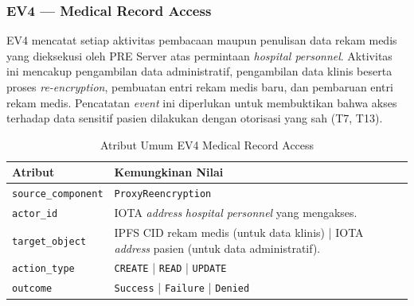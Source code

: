 \subsubsection{EV4 --- Medical Record Access}
\label{subsec:ev4-medical-record-access}

EV4 mencatat setiap aktivitas pembacaan maupun penulisan data rekam medis
yang dieksekusi oleh PRE Server atas permintaan \textit{hospital personnel}.
Aktivitas ini mencakup pengambilan data administratif, pengambilan data klinis
beserta proses \textit{re-encryption}, pembuatan entri rekam medis baru, dan
pembaruan entri rekam medis. Pencatatan \textit{event} ini diperlukan untuk
membuktikan bahwa akses terhadap data sensitif pasien dilakukan dengan otorisasi
yang sah (T7, T13).

\begin{table}[htbp]
\centering
\caption{Atribut Umum EV4 Medical Record Access}
\label{tab:ev4-umum}
\renewcommand{\arraystretch}{1.3}
\begin{tabular}{|p{3.5cm}|p{8.5cm}|}
\hline
\textbf{Atribut} & \textbf{Kemungkinan Nilai} \\
\hline
\texttt{source\_component} &
\texttt{ProxyReencryption} \\
\hline
\texttt{actor\_id} &
IOTA \textit{address} \textit{hospital personnel} yang mengakses. \\
\hline
\texttt{target\_object} &
IPFS CID rekam medis (untuk data klinis) | IOTA \textit{address} pasien
(untuk data administratif). \\
\hline
\texttt{action\_type} &
\texttt{CREATE} | \texttt{READ} | \texttt{UPDATE} \\
\hline
\texttt{outcome} &
\texttt{Success} | \texttt{Failure} | \texttt{Denied} \\
\hline
\end{tabular}
\end{table}

